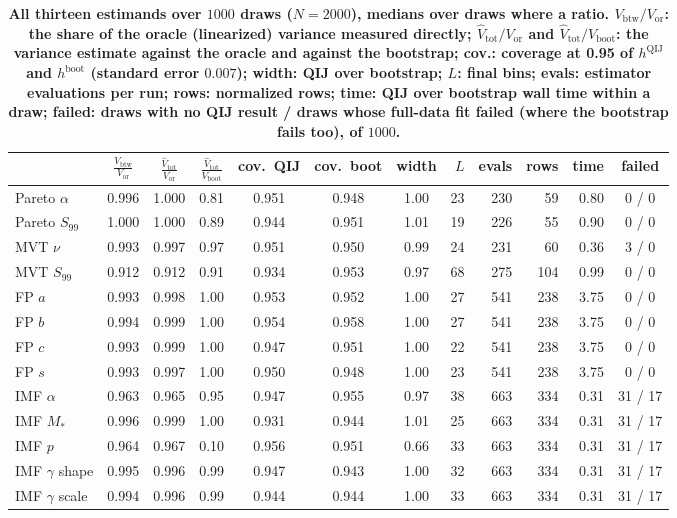 \documentclass[runningheads]{llncs}
\newif\ifrev \revtrue
\newcommand{\rev}[1]{\ifrev{\color{blue}\bfseries #1}\else#1\fi}
\newcommand{\Vcell}{V_{\mathrm{btw}}}
\newcommand{\Vtothat}{\hat V_{\mathrm{tot}}}
\newcommand{\hqij}[1]{h^{\mathrm{QIJ}}_{#1}}
\newcommand{\hboot}[1]{h^{\mathrm{boot}}_{#1}}
\begin{document}
\begin{table}[t]
\caption{\rev{All thirteen estimands over $1000$ draws ($N = 2000$), medians over draws where a ratio. $\Vcell/V_{\mathrm{or}}$: the share of the oracle (linearized) variance measured directly; $\Vtothat/V_{\mathrm{or}}$ and $\Vtothat/V_{\mathrm{boot}}$: the variance estimate against the oracle and against the bootstrap; cov.: coverage at 0.95 of $\hqij{}$ and $\hboot{}$ (standard error $0.007$); width: QIJ over bootstrap; $L$: final bins; evals: estimator evaluations per run; rows: normalized rows; time: QIJ over bootstrap wall time within a draw; failed: draws with no QIJ result / draws whose full-data fit failed (where the bootstrap fails too), of $1000$.}}
\label{tab:t1}
\centering
\setlength{\tabcolsep}{2.6pt}
{\scriptsize
\begin{tabular}{@{}lccccccrrrrc@{}}
\toprule
 & $\frac{\Vcell}{V_{\mathrm{or}}}$ & $\frac{\Vtothat}{V_{\mathrm{or}}}$ & $\frac{\Vtothat}{V_{\mathrm{boot}}}$ & cov.\ QIJ & cov.\ boot & width & $L$ & evals & rows & time & failed \\
\midrule
Pareto $\alpha$ & 0.996 & 1.000 & 0.81 & 0.951 & 0.948 & 1.00 & 23 & 230 & 59 & 0.80 & 0 / 0 \\
Pareto $S_{99}$ & 1.000 & 1.000 & 0.89 & 0.944 & 0.951 & 1.01 & 19 & 226 & 55 & 0.90 & 0 / 0 \\
MVT $\nu$ & 0.993 & 0.997 & 0.97 & 0.951 & 0.950 & 0.99 & 24 & 231 & 60 & 0.36 & 3 / 0 \\
MVT $S_{99}$ & 0.912 & 0.912 & 0.91 & 0.934 & 0.953 & 0.97 & 68 & 275 & 104 & 0.99 & 0 / 0 \\
FP $a$ & 0.993 & 0.998 & 1.00 & 0.953 & 0.952 & 1.00 & 27 & 541 & 238 & 3.75 & 0 / 0 \\
FP $b$ & 0.994 & 0.999 & 1.00 & 0.954 & 0.958 & 1.00 & 27 & 541 & 238 & 3.75 & 0 / 0 \\
FP $c$ & 0.993 & 0.999 & 1.00 & 0.947 & 0.951 & 1.00 & 22 & 541 & 238 & 3.75 & 0 / 0 \\
FP $s$ & 0.993 & 0.997 & 1.00 & 0.950 & 0.948 & 1.00 & 23 & 541 & 238 & 3.75 & 0 / 0 \\
IMF $\alpha$ & 0.963 & 0.965 & 0.95 & 0.947 & 0.955 & 0.97 & 38 & 663 & 334 & 0.31 & 31 / 17 \\
IMF $M_*$ & 0.996 & 0.999 & 1.00 & 0.931 & 0.944 & 1.01 & 25 & 663 & 334 & 0.31 & 31 / 17 \\
IMF $p$ & 0.964 & 0.967 & 0.10 & 0.956 & 0.951 & 0.66 & 33 & 663 & 334 & 0.31 & 31 / 17 \\
IMF $\gamma$ shape & 0.995 & 0.996 & 0.99 & 0.947 & 0.943 & 1.00 & 32 & 663 & 334 & 0.31 & 31 / 17 \\
IMF $\gamma$ scale & 0.994 & 0.996 & 0.99 & 0.944 & 0.944 & 1.00 & 33 & 663 & 334 & 0.31 & 31 / 17 \\
\bottomrule
\end{tabular}}
\end{table}
\end{document}
